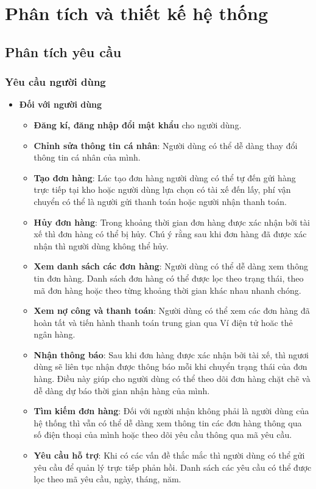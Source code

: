 \chapter{Phân tích và thiết kế hệ thống}

\section{Phân tích yêu cầu}
    \subsection{Yêu cầu người dùng}
    	\begin{itemize}
				\item \textbf{Đối với người dùng}
					\begin{itemize}
				        \item \textbf{Đăng kí, đăng nhập đổi mật khẩu} cho người dùng.
				        \item \textbf{Chỉnh sửa thông tin cá nhân}: Người dùng có thể dễ dàng thay đổi thông tin cá nhân của mình.
				        \item \textbf{Tạo đơn hàng}: Lúc tạo đơn hàng người dùng có thể tự đến gửi hàng trực tiếp tại kho hoặc người dùng lựa chọn có tài xế đến lấy, phí vận chuyển có thể là người gửi thanh toán hoặc người nhận thanh toán.
				        \item \textbf{Hủy đơn hàng}: Trong khoảng thời gian đơn hàng được xác nhận bởi tài xế thì đơn hàng có thể bị hủy. Chú ý rằng sau khi đơn hàng đã được xác nhận thì người dùng không thể hủy.
				        \item \textbf{Xem danh sách các đơn hàng}: Người dùng có thể dễ dàng xem thông tin đơn hàng. Danh sách đơn hàng có thể được lọc theo trạng thái, theo mã đơn hàng hoặc theo từng khoảng thời gian khác nhau nhanh chóng.
				        \item \textbf{Xem nợ công và thanh toán}: Người dùng có thể xem các đơn hàng đã hoàn tất và tiến hành thanh toán trung gian qua Ví điện tử hoăc thẻ ngân hàng.

				        \item \textbf{Nhận thông báo}: Sau khi đơn hàng được xác nhận bởi tài xế, thì ngươi dùng sẽ liên tục nhận được thông báo mỗi khi chuyển trạng thái của đơn hàng. Điều này giúp cho người dùng có thể theo dõi đơn hàng chặt chẽ và dễ dàng dự báo thời gian nhận hàng của mình.

				        \item \textbf{Tìm kiếm đơn hàng}: Đối với người nhận không phải là người dùng của hệ thống thì vẫn có thể dễ dàng xem thông tin các đơn hàng thông qua số điện thoại của mình hoặc theo dõi yêu cầu thông qua mã yêu cầu.
				        \item \textbf{Yêu cầu hỗ trợ}: Khi có các vấn đề thắc mắc thì người dùng có thể gửi yêu cầu để quản lý trực tiếp phản hồi. Danh sách các yêu cầu có thể được lọc theo mã yêu cầu, ngày, tháng, năm.
				        

\end{itemize}
\end{itemize}
